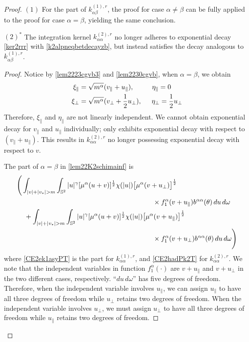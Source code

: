 \documentclass[reqno]{amsart}
\numberwithin{equation}{section}
\numberwithin{equation}{section}
\begin{document}
\begin{proof}
		$(1)$ For the part of $k_{\alpha \beta}^{(1),r}$, the proof for case $\alpha\neq\beta$ can be fully applied to the proof for case $\alpha=\beta$, yielding the same conclusion.
		
		$(2)^{*}$  The integration kernel‌ $k_{\alpha \alpha}^{(2),r}$ no longer adheres to exponential decay \eqref{ker2rrr} with \eqref{k2alpneqbetdecayzb},
		but instead satisfies the decay  analogous to $k_{\alpha \beta}^{(1),r}$.
		\begin{proof}
			Notice by \eqref{lem2223cgvb3} and \eqref{lem2230cgvb}, when $\alpha=\beta$, we obtain
			\begin{eqnarray*}
				\begin{split}
					\xi_{\parallel} &= \sqrt{m^\alpha}(v_{\parallel}+u_{\parallel}), \hspace{0.93cm}  \eta_{\parallel}=0\\
					\xi_{\perp} &= \sqrt{m^\alpha}(v_{\perp}+\frac{1}{2}u_{\perp}),\hspace{0.5cm}\eta_{\perp}=\frac{1}{2}u_{\perp}
				\end{split}
			\end{eqnarray*}
			Therefore, $\xi_{\parallel}$ and $\eta_{\parallel}$ are not linearly independent. We cannot obtain exponential decay for $v_{\parallel}$ and $u_{\parallel}$ individually; only  exhibits exponential decay with respect to $(v_{\parallel}+u_{\parallel})$. This results in $k_{\alpha \alpha}^{(2),r}$ no longer possessing exponential decay with respect to $v$.
			
			The part of $\alpha=\beta$ in \eqref{lem22K2schimainf} is
			\begin{align}
				&\Bigg(\int_{|v|+|v_*|>m}\int_{\mathbb{S}^2} |u|^{\gamma} [\mu^{\alpha}(u+v)]^{\frac{1}{2}}\chi(|u|)\big[\mu^{\alpha}(v + u_{\perp})\big]^{\frac{1}{2}}\label{CE2ek1asyPT}\\
				&\hspace{7cm}\times f^\alpha_1(v + u_{\parallel})b^{ \alpha \alpha}(\theta) \, du \, d\omega \notag\\
				& \hspace{0.4cm}+\int_{|v|+|v_*|>m}\int_{\mathbb{S}^2} |u|^{\gamma} [\mu^{\alpha}(u+v)]^{\frac{1}{2}}\chi(|u|)\big[\mu^{\alpha}(v + u_{\parallel})\big]^{\frac{1}{2}}\label{CE2hadPk2T}\\
				&\hspace{7cm}\times f^\alpha_1(v + u_{\perp})b^{ \alpha \alpha}(\theta) \, du \, d\omega \Bigg)\notag
			\end{align}
			where \eqref{CE2ek1asyPT} is the part for $k_{\alpha \alpha}^{(1),r}$, and \eqref{CE2hadPk2T} for $k_{\alpha \alpha}^{(2),r}$. ‌We note that the independent variables in function $f^\alpha_1(\cdot)$ are $v+u_{\parallel}$ and $v+u_{\perp}$ in the two different cases, respectively. ``$du\,d\omega$'' has five degrees of freedom. Therefore, when the independent variable involves $u_{\parallel}$, we can assign $u_{\parallel}$ to have all three degrees of freedom while $u_{\perp}$ retains two degrees of freedom. When the independent variable involves $u_{\perp}$, we must assign $u_{\perp}$ to have all three degrees of freedom while $u_{\parallel}$ retains two degrees of freedom.
			

\end{proof}
\end{proof}
\end{document}
